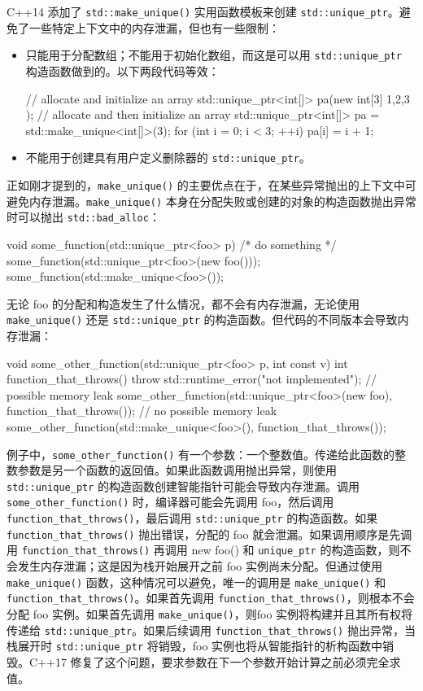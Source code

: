 C++14 添加了 \verb|std::make_unique()| 实用函数模板来创建 \verb|std::unique_ptr|。避免了一些特定上下文中的内存泄漏，但也有一些限制：

\begin{itemize}
\item
只能用于分配数组；不能用于初始化数组，而这是可以用 \verb|std::unique_ptr| 构造函数做到的。以下两段代码等效：

\begin{cpp}
// allocate and initialize an array
std::unique_ptr<int[]> pa(new int[3]{ 1,2,3 });
// allocate and then initialize an array
std::unique_ptr<int[]> pa = std::make_unique<int[]>(3);
for (int i = 0; i < 3; ++i)
    pa[i] = i + 1;
\end{cpp}

\item
不能用于创建具有用户定义删除器的 \verb|std::unique_ptr|。
\end{itemize}

正如刚才提到的，\verb|make_unique()| 的主要优点在于，在某些异常抛出的上下文中可避免内存泄漏。\verb|make_unique()| 本身在分配失败或创建的对象的构造函数抛出异常时可以抛出 \verb|std::bad_alloc|：

\begin{cpp}
void some_function(std::unique_ptr<foo> p)
{ /* do something */ }
some_function(std::unique_ptr<foo>(new foo()));
some_function(std::make_unique<foo>());
\end{cpp}

无论 foo 的分配和构造发生了什么情况，都不会有内存泄漏，无论使用 \verb|make_unique()| 还是 \verb|std::unique_ptr| 的构造函数。但代码的不同版本会导致内存泄漏：

\begin{cpp}
void some_other_function(std::unique_ptr<foo> p, int const v)
{
}
int function_that_throws()
{
    throw std::runtime_error("not implemented");
}
// possible memory leak
some_other_function(std::unique_ptr<foo>(new foo),
                    function_that_throws());
// no possible memory leak
some_other_function(std::make_unique<foo>(),
                    function_that_throws());
\end{cpp}

例子中，\verb|some_other_function()| 有一个参数：一个整数值。传递给此函数的整数参数是另一个函数的返回值。如果此函数调用抛出异常，则使用 \verb|std::unique_ptr| 的构造函数创建智能指针可能会导致内存泄漏。调用 \verb|some_other_function()| 时，编译器可能会先调用 foo，然后调用 \verb|function_that_throws()|，最后调用 \verb|std::unique_ptr| 的构造函数。如果 \verb|function_that_throws()| 抛出错误，分配的 foo 就会泄漏。如果调用顺序是先调用 \verb|function_that_throws()| 再调用 new foo() 和 \verb|unique_ptr| 的构造函数，则不会发生内存泄漏；这是因为栈开始展开之前 foo 实例尚未分配。但通过使用 \verb|make_unique()| 函数，这种情况可以避免，唯一的调用是 \verb|make_unique()| 和 \verb|function_that_throws()|。如果首先调用 \verb|function_that_throws()|，则根本不会分配 foo 实例。如果首先调用 \verb|make_unique()|，则foo 实例将构建并且其所有权将传递给 \verb|std::unique_ptr|。如果后续调用 \verb|function_that_throws()| 抛出异常，当栈展开时 \verb|std::unique_ptr| 将销毁，foo 实例也将从智能指针的析构函数中销毁。C++17 修复了这个问题，要求参数在下一个参数开始计算之前必须完全求值。

